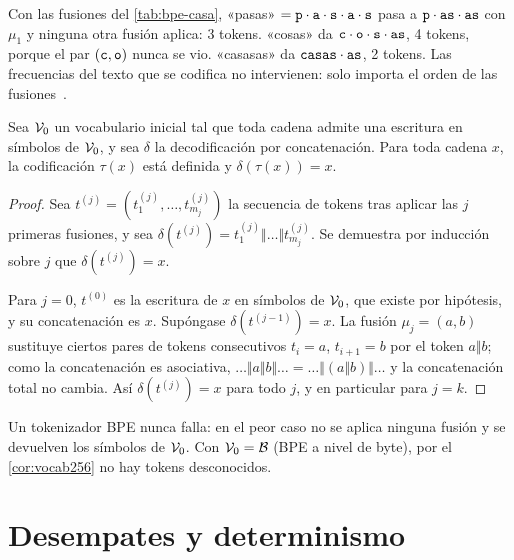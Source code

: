 \begin{ejemplo}\label{ej:codificar}
Con las fusiones del \cref{tab:bpe-casa}, «pasas» $=\texttt{p}\cdot\texttt{a}\cdot\texttt{s}\cdot\texttt{a}\cdot\texttt{s}$ pasa a $\texttt{p}\cdot\texttt{as}\cdot\texttt{as}$ con $\mu_1$ y ninguna otra fusión aplica: 3 tokens. «cosas» da $\texttt{c}\cdot\texttt{o}\cdot\texttt{s}\cdot\texttt{as}$, 4 tokens, porque el par $(\texttt{c},\texttt{o})$ nunca se vio. «casasas» da $\texttt{casas}\cdot\texttt{as}$, 2 tokens. Las frecuencias del texto que se codifica no intervienen: solo importa el orden de las fusiones~\cite[§2.4.2]{jm3}.
\end{ejemplo}

\begin{teorema}\label{teo:bpe-correcto}
Sea $\mathcal{V}_0$ un vocabulario inicial tal que toda cadena admite una escritura en símbolos de $\mathcal{V}_0$, y sea $\delta$ la decodificación por concatenación. Para toda cadena $x$, la codificación $\tau(x)$ está definida y $\delta(\tau(x))=x$.
\end{teorema}

\begin{proof}
Sea $t^{(j)}=(t^{(j)}_1,\dots,t^{(j)}_{m_j})$ la secuencia de tokens tras aplicar las $j$ primeras fusiones, y sea $\delta(t^{(j)})=t^{(j)}_1\Vert\dots\Vert t^{(j)}_{m_j}$. Se demuestra por inducción sobre $j$ que $\delta(t^{(j)})=x$.

Para $j=0$, $t^{(0)}$ es la escritura de $x$ en símbolos de $\mathcal{V}_0$, que existe por hipótesis, y su concatenación es $x$. Supóngase $\delta(t^{(j-1)})=x$. La fusión $\mu_j=(a,b)$ sustituye ciertos pares de tokens consecutivos $t_i=a$, $t_{i+1}=b$ por el token $a\Vert b$; como la concatenación es asociativa, $\dots\Vert a\Vert b\Vert\dots=\dots\Vert(a\Vert b)\Vert\dots$ y la concatenación total no cambia. Así $\delta(t^{(j)})=x$ para todo $j$, y en particular para $j=k$.
\end{proof}

\begin{corolario}\label{cor:no-unk}
Un tokenizador BPE nunca falla: en el peor caso no se aplica ninguna fusión y se devuelven los símbolos de $\mathcal{V}_0$. Con $\mathcal{V}_0=\mathcal{B}$ (BPE a nivel de byte), por el \cref{cor:vocab256} no hay tokens desconocidos.
\end{corolario}

\section{Desempates y determinismo}

